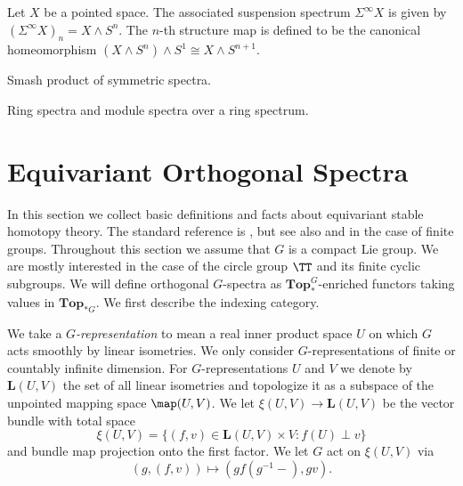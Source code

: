 \begin{bsp}
\end{bsp}

\begin{bsp}
Let $X$ be a pointed space. The associated suspension spectrum $\Sigma^\infty X$ is given
by $(\Sigma^\infty X)_n= X\wedge S^n$. The $n$-th structure map is defined to be the canonical homeomorphism
$(X\wedge S^n)\wedge S^1\cong X\wedge S^{n+1}$.
\end{bsp}
\begin{mydef}
Smash product of symmetric spectra.
\end{mydef}

\begin{mydef}
Ring spectra and module spectra over a ring spectrum.
\end{mydef}

\begin{bsp}

\end{bsp}

\section{Equivariant Orthogonal Spectra}
In this section we collect basic definitions and facts about equivariant 
stable homotopy theory. The standard reference is \cite{mandellmay},
but see also \cite{schwedeequivariant} and \cite[Section~3-7]{rvadams}
in the case of finite groups.
Throughout this section we assume that $G$ is a compact Lie group.
We are mostly interested in the case of the circle group $\TT$ and its
finite cyclic subgroups. We will define orthogonal $G$-spectra
as $\mathbf{Top}_\ast^G$-enriched functors taking values
in $\mathbf{Top}_{\ast G}$. We first describe the indexing category.

We take a $G$\textit{-representation} to mean a real inner product
space $U$ on which $G$ acts smoothly by linear isometries. We only
consider $G$-representations of finite or countably infinite
dimension. For $G$-representations $U$ and $V$ we denote
by $\mathbf{L}(U,V)$ the set of all linear isometries and topologize
it as a subspace of the unpointed mapping space $\map(U,V)$. 
We let $\xi(U,V)\to \mathbf{L}(U,V)$
be the vector bundle with total space
\[
\xi(U,V) = \{(f,v)\in \mathbf{L}(U,V)\times V:f(U)\perp v\}
\]
and bundle map projection onto the first factor. We let $G$
act on $\xi(U,V)$ via 
\begin{equation}\label{eq:thomspaceaction}
(g,(f,v))\mapsto (gf(g^{-1}-),gv).
\end{equation}


